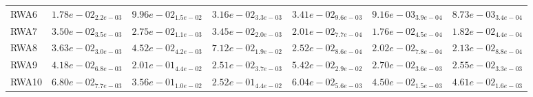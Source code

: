 \documentclass{article}
\begin{document}
\begin{table}
\begin{scriptsize}
\begin{tabular}{lllllll}
RWA6 & $  1.78e-02_{ 2.2e-03}$ & $  9.96e-02_{ 1.5e-02}$ & $  3.16e-02_{ 3.3e-03}$ & $  3.41e-02_{ 9.6e-03}$ & \cellcolor{gray25}$  9.16e-03_{ 3.9e-04}$ & \cellcolor{gray95}$  8.73e-03_{ 3.4e-04}$ \\
RWA7 & $  3.50e-02_{ 3.5e-03}$ & $  2.75e-02_{ 1.1e-03}$ & $  3.45e-02_{ 2.0e-03}$ & $  2.01e-02_{ 7.7e-04}$ & \cellcolor{gray95}$  1.76e-02_{ 4.5e-04}$ & \cellcolor{gray25}$  1.82e-02_{ 4.4e-04}$ \\
RWA8 & $  3.63e-02_{ 3.0e-03}$ & $  4.52e-02_{ 4.2e-03}$ & $  7.12e-02_{ 1.9e-02}$ & $  2.52e-02_{ 8.6e-04}$ & \cellcolor{gray95}$  2.02e-02_{ 7.8e-04}$ & \cellcolor{gray25}$  2.13e-02_{ 8.8e-04}$ \\
RWA9 & $  4.18e-02_{ 6.8e-03}$ & $  2.01e-01_{ 4.4e-02}$ & \cellcolor{gray95}$  2.51e-02_{ 3.7e-03}$ & $  5.42e-02_{ 2.9e-02}$ & $  2.70e-02_{ 3.6e-03}$ & \cellcolor{gray25}$  2.55e-02_{ 3.3e-03}$ \\
RWA10 & $  6.80e-02_{ 7.7e-03}$ & $  3.56e-01_{ 1.0e-02}$ & $  2.52e-01_{ 4.4e-02}$ & $  6.04e-02_{ 5.6e-03}$ & \cellcolor{gray95}$  4.50e-02_{ 1.5e-03}$ & \cellcolor{gray25}$  4.61e-02_{ 1.6e-03}$ \\
\hline
\end{tabular}
\end{scriptsize}
\end{table}
\end{document}

